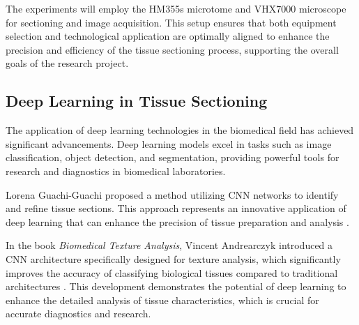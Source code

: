 The experiments will employ the HM355s microtome and VHX7000 microscope for sectioning and image acquisition. This setup ensures that both equipment selection and technological application are optimally aligned to enhance the precision and efficiency of the tissue sectioning process, supporting the overall goals of the research project.











\subsection{Deep Learning in Tissue Sectioning}

The application of deep learning technologies in the biomedical field has achieved significant advancements. Deep learning models excel in tasks such as image classification, object detection, and segmentation, providing powerful tools for research and diagnostics in biomedical laboratories.

Lorena Guachi-Guachi proposed a method utilizing CNN networks to identify and refine tissue sections. This approach represents an innovative application of deep learning that can enhance the precision of tissue preparation and analysis \cite{LR.7}.

In the book \textit{Biomedical Texture Analysis}, Vincent Andrearczyk introduced a CNN architecture specifically designed for texture analysis, which significantly improves the accuracy of classifying biological tissues compared to traditional architectures \cite{LR.8}. This development demonstrates the potential of deep learning to enhance the detailed analysis of tissue characteristics, which is crucial for accurate diagnostics and research.

